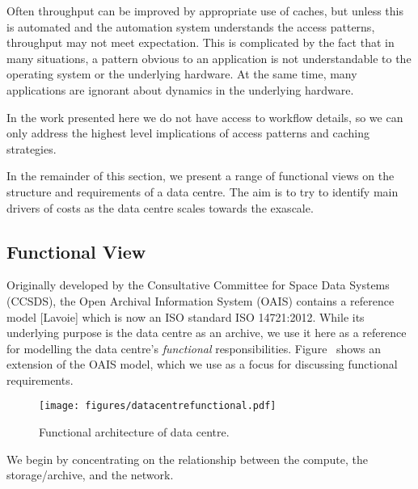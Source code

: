 Often throughput can be improved by appropriate use of caches, but unless this
is automated and the automation system understands the access patterns,
throughput may not meet expectation. This is complicated by the fact that  in
many situations, a pattern obvious to an application is not understandable to
the operating system or the underlying hardware. At the same time, many
applications are ignorant about dynamics in the underlying hardware.

In the work presented here we do not have access to workflow details, so we can
only address the highest level implications of access patterns and caching strategies.

In the remainder of this section, we present a range of functional views
on the structure and requirements of a data centre. The aim is to try to identify
main drivers of costs as the data centre scales towards the exascale.

\subsection{Functional View}
\label{sec:dc_func}
\label{sec:dc_services}
\label{sec:dc_discovery}

Originally developed by the Consultative Committee for Space Data Systems
(CCSDS), the Open Archival Information System (OAIS) contains a reference model
[Lavoie] which is now an ISO standard ISO 14721:2012.  While its underlying
purpose is the data centre as an archive, we use it here as a reference for
modelling the data centre's \emph{functional} responsibilities.
Figure~ shows an extension of the OAIS model, which we use
as a focus for discussing functional requirements.

\begin{figure}[]
  \centering
  \texttt{[image: figures/datacentrefunctional.pdf]}
  \caption{Functional architecture of data centre. }
  \label{fig:dc_arch}
\end{figure}

We begin by
concentrating on the relationship between the compute, the storage/archive,
and the network.



